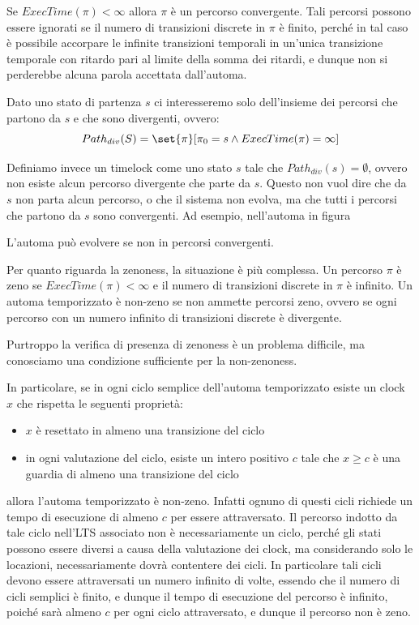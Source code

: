 Se \(ExecTime(\pi)<\infty\) allora \(\pi\) è un percorso convergente. Tali percorsi possono essere ignorati se il numero di transizioni discrete in \(\pi\) è finito, perché in tal caso è possibile accorpare le infinite transizioni temporali in un'unica transizione temporale con ritardo pari al limite della somma dei ritardi, e dunque non si perderebbe alcuna parola accettata dall'automa.

Dato uno stato di partenza \(s\) ci interesseremo solo dell'insieme dei percorsi che partono da \(s\) e che sono divergenti, ovvero:
\[Path_{div}(S) = \set{\pi}[\pi_0 = s \land ExecTime(\pi) =\infty]\]

Definiamo invece un timelock come uno stato \(s\) tale che \(Path_{div}(s) = \emptyset\), ovvero non esiste alcun percorso divergente che parte da \(s\). Questo non vuol dire che da \(s\) non parta alcun percorso, o che il sistema non evolva, ma che tutti i percorsi che partono da \(s\) sono convergenti. Ad esempio, nell'automa in figura

L'automa può evolvere se non in percorsi convergenti.

Per quanto riguarda la zenoness, la situazione è più complessa. Un percorso \(\pi\) è zeno se \(ExecTime(\pi)<\infty\) e il numero di transizioni discrete in \(\pi\) è infinito. Un automa temporizzato è non-zeno se non ammette percorsi zeno, ovvero se ogni percorso con un numero infinito di transizioni discrete è divergente.

Purtroppo la verifica di presenza di zenoness è un problema difficile, ma conosciamo una condizione sufficiente per la non-zenoness.

In particolare, se in ogni ciclo semplice dell'automa temporizzato esiste un clock \(x\) che rispetta le seguenti proprietà:
\begin{itemize}
  \item \(x\) è resettato in almeno una transizione del ciclo
  \item in ogni valutazione del ciclo, esiste un intero positivo \(c\) tale che \(x \geq c\) è una guardia di almeno una transizione del ciclo
\end{itemize}
allora l'automa temporizzato è non-zeno. Infatti ognuno di questi cicli richiede un tempo di esecuzione di almeno \(c\) per essere attraversato. Il percorso indotto da tale ciclo nell'LTS associato non è necessariamente un ciclo, perché gli stati possono essere diversi a causa della valutazione dei clock, ma considerando solo le locazioni, necessariamente dovrà contentere dei cicli. In particolare tali cicli devono essere attraversati un numero infinito di volte, essendo che il numero di cicli semplici è finito, e dunque il tempo di esecuzione del percorso è infinito, poiché sarà almeno \(c\) per ogni ciclo attraversato, e dunque il percorso non è zeno.

